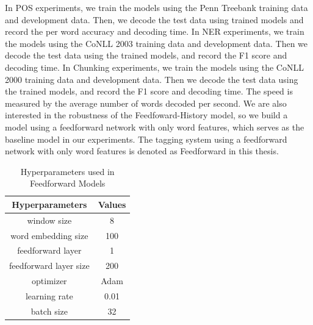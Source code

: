 In POS experiments, we train the models using the Penn Treebank training data and development data. Then, we decode the test data using trained models and record the per word accuracy and decoding time. In NER experiments, we train the models using the CoNLL 2003 training data and development data. Then we decode the test data using the trained models, and record the F1 score and decoding time. In Chunking experiments, we train the models using the CoNLL 2000 training data and development data. Then we decode the test data using the trained models, and record the F1 score and decoding time. The speed is measured by the average number of words decoded per second. We are also interested in the robustness of the Feedfoward-History model, so we build a model using a feedforward network with only word features, which serves as the baseline model in our experiments. The tagging system using a feedforward network with only word features is denoted as Feedforward in this thesis.


\begin{table}[h]
\centering
\caption{Hyperparameters used in Feedforward Models}
\label{table:hyperparameters1}
\begin{tabular}{|c|c|}
\hline
Hyperparameters & Values \\ \hline
window size   & 8 \\ \hline
word embedding size & 100 \\ \hline
feedforward layer & 1 \\ \hline
feedforward layer size & 200 \\ \hline
optimizer & Adam \\ \hline
learning rate & 0.01 \\ \hline
batch size & 32 \\ \hline
\end{tabular}
\end{table}

